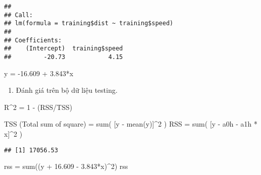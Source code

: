 \documentclass[
]{article}
\newenvironment{Shaded}{\begin{snugshade}}{\end{snugshade}}
\newcommand{\DecValTok}[1]{\textcolor[rgb]{0.00,0.00,0.81}{#1}}
\newcommand{\FloatTok}[1]{\textcolor[rgb]{0.00,0.00,0.81}{#1}}
\newcommand{\FunctionTok}[1]{\textcolor[rgb]{0.00,0.00,0.00}{#1}}
\newcommand{\NormalTok}[1]{#1}
\newcommand{\OtherTok}[1]{\textcolor[rgb]{0.56,0.35,0.01}{#1}}
\newcommand{\SpecialCharTok}[1]{\textcolor[rgb]{0.00,0.00,0.00}{#1}}
\providecommand{\tightlist}{%
  \setlength{\itemsep}{0pt}\setlength{\parskip}{0pt}}
\begin{document}
\begin{Shaded}
\end{Shaded}

\begin{verbatim}
## 
## Call:
## lm(formula = training$dist ~ training$speed)
## 
## Coefficients:
##    (Intercept)  training$speed  
##         -20.73            4.15
\end{verbatim}

y = -16.609 + 3.843*x

\begin{enumerate}
\def\labelenumi{\arabic{enumi}.}
\setcounter{enumi}{2}
\tightlist
\item
  Đánh giá trên bộ dữ liệu testing.
\end{enumerate}

R\^{}2 = 1 - (RSS/TSS)

TSS (Total sum of square) = sum( {[}y - mean(y){]}\^{}2 ) RSS = sum(
{[}y - a0h - a1h * x{]}\^{}2 )

\begin{Shaded}
\end{Shaded}

\begin{verbatim}
## [1] 17056.53
\end{verbatim}

\begin{Shaded}
\begin{Highlighting}[]
\NormalTok{rss }\OtherTok{=} \FunctionTok{sum}\NormalTok{((y }\SpecialCharTok{+} \FloatTok{16.609}  \SpecialCharTok{{-}} \FloatTok{3.843}\SpecialCharTok{*}\NormalTok{x)}\SpecialCharTok{\^{}}\DecValTok{2}\NormalTok{)}
\NormalTok{rss}
\end{Highlighting}
\end{Shaded}
\end{document}

